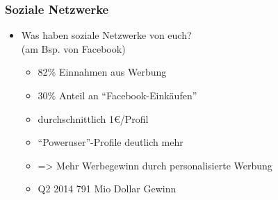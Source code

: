 \begin{frame}
  \frametitle{Soziale Netzwerke}

  \begin{itemize}
    \item Was haben soziale Netzwerke von euch?\\(am Bsp. von Facebook)
      \begin{itemize}
        \item<2-> 82\% Einnahmen aus Werbung
        \item<3-> 30\% Anteil an "`Facebook-Einkäufen"'
        \item<4-> durchschnittlich 1€/Profil
        \item<5-> "`Poweruser"'-Profile deutlich mehr
        \item<6-> => Mehr Werbegewinn durch personalisierte Werbung
        \item<7-> Q2 2014 791 Mio Dollar Gewinn
      \end{itemize}
  \end{itemize}
\end{frame}
